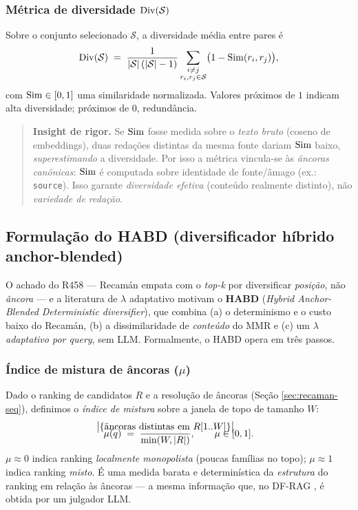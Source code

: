 \subsubsection{Métrica de diversidade $\mathrm{Div}(\mathcal{S})$}

Sobre o conjunto selecionado $\mathcal{S}$, a diversidade média entre pares é
\[
\label{eq:diversity}
\mathrm{Div}(\mathcal{S})
\;=\; \frac{1}{|\mathcal{S}|\,(|\mathcal{S}|-1)}
\sum_{\substack{i\ne j\\ r_i,r_j\in\mathcal{S}}}
\bigl(1 - \mathrm{Sim}(r_i, r_j)\bigr),
\]
com $\mathrm{Sim}\in[0,1]$ uma similaridade normalizada. Valores próximos de $1$ indicam
alta diversidade; próximos de $0$, redundância.

\begin{quote}\small
\textbf{Insight de rigor.} Se $\mathrm{Sim}$ fosse medida sobre o \emph{texto bruto}
(coseno de embeddings), duas redações distintas da mesma fonte dariam $\mathrm{Sim}$
baixo, \emph{superestimando} a diversidade. Por isso a métrica vincula-se às
\emph{âncoras canônicas}: $\mathrm{Sim}$ é computada sobre identidade de
fonte/âmago (ex.: \texttt{source}). Isso garante \emph{diversidade efetiva}
(conteúdo realmente distinto), não \emph{variedade de redação}.
\end{quote}

\subsection{Formulação do HABD (diversificador híbrido anchor-blended)}

O achado do R458 — Recamán empata com o \emph{top-k} por diversificar
\emph{posição}, não \emph{âncora} — e a literatura de $\lambda$ adaptativo
\citep{Khan2026DFRAG,RezaeiDieng2025VendiRAG,GuoSanner2010PLMMR} motivam o
\textbf{HABD} (\emph{Hybrid Anchor-Blended Deterministic diversifier}), que
combina (a) o determinismo e o custo baixo do Recamán, (b) a dissimilaridade de
\emph{conteúdo} do MMR e (c) um $\lambda$ \emph{adaptativo por query}, sem LLM.
Formalmente, o HABD opera em três passos.

\subsubsection{Índice de mistura de âncoras ($\mu$)}

Dado o ranking de candidatos $R$ e a resolução de âncoras (Seção
\ref{sec:recaman-seq}), definimos o \emph{índice de mistura} sobre a janela de
topo de tamanho $W$:
\[
\label{eq:mu}
\mu(q) \;=\; \frac{
\mathclap{\bigl|\{ \text{\"ancoras distintas em } R[1..W] \}\bigr|}
}{
\min(W, |R|)
} ,
\qquad \mu \in [0,1].
\]
$\mu\approx 0$ indica ranking \emph{localmente monopolista} (poucas famílias no
topo); $\mu\approx 1$ indica ranking \emph{misto}. É uma medida barata e
determinística da \emph{estrutura} do ranking em relação às âncoras — a mesma
informação que, no DF-RAG \citep{Khan2026DFRAG}, é obtida por um julgador LLM.

